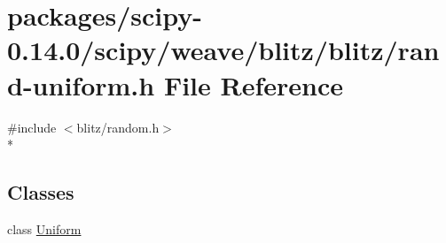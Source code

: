 \hypertarget{rand-uniform_8h}{}\section{packages/scipy-\/0.14.0/scipy/weave/blitz/blitz/rand-\/uniform.h File Reference}
\label{rand-uniform_8h}
{\ttfamily \#include $<$blitz/random.\+h$>$}\\*
\subsection*{Classes}
\begin{DoxyCompactItemize}
\item 
class \hyperlink{classUniform}{Uniform}
\end{DoxyCompactItemize}
